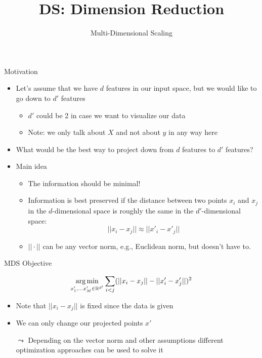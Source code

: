 \documentclass[aspectratio=169]{../latex_main/tntbeamer}  %
\title[Statistics]{DS: Dimension Reduction}
\subtitle{Multi-Dimensional Scaling}
\begin{document}
	
	\maketitle
	
    \begin{frame}[c]{Motivation}
        
        \begin{itemize}
            \item Let's assume that we have $d$ features in our input space, but we would like to go down to $d'$ features
            \begin{itemize}
                \item $d'$ could be 2 in case we want to visualize our data
                \item Note: we only talk about $X$ and not about $y$ in any way here
            \end{itemize}
            \medskip
            \item What would be the best way to project down from $d$ features to $d'$ features?
            \item Main idea
            \begin{itemize}
                \item The information should be minimal!
                \item Information is best preserved if the distance between two points $x_i$ and $x_j$ in the $d$-dimensional space is roughly the same in the $d'$-dimensional space:
                $$ ||x_i - x_j || \approx || x'_i - x'_j || $$
                \item $||\cdot||$ can be any vector norm, e.g., Euclidean norm, but doesn't have to.
            \end{itemize}
        \end{itemize}

	\end{frame}
	
	\begin{frame}[c]{MDS Objective}
        
         $$\operatorname*{arg\,min}_{x'_1, \ldots x'_M \in \mathbb{R}^{d'}} \sum_{i< j}  (||x_i - x_j || - || x'_i - x'_j ||)^2$$
        
        \begin{itemize}
            
            \item Note that $||x_i - x_j ||$ is fixed since the data is given
            \item We can only change our projected points $x'$
            \item[$\leadsto$] Depending on the vector norm and other assumptions different optimization approaches can be used to solve it
        \end{itemize}
        
	\end{frame}
	
\end{document}
